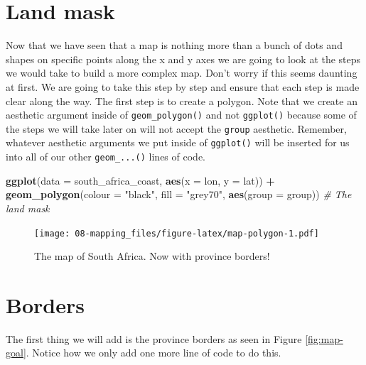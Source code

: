 \documentclass[
]{book}
\newenvironment{Shaded}{\begin{snugshade}}{\end{snugshade}}
\newcommand{\CommentTok}[1]{\textcolor[rgb]{0.56,0.35,0.01}{\textit{#1}}}
\newcommand{\DataTypeTok}[1]{\textcolor[rgb]{0.13,0.29,0.53}{#1}}
\newcommand{\KeywordTok}[1]{\textcolor[rgb]{0.13,0.29,0.53}{\textbf{#1}}}
\newcommand{\NormalTok}[1]{#1}
\newcommand{\OperatorTok}[1]{\textcolor[rgb]{0.81,0.36,0.00}{\textbf{#1}}}
\newcommand{\StringTok}[1]{\textcolor[rgb]{0.31,0.60,0.02}{#1}}
\begin{document}
\hypertarget{land-mask}{%
\section{Land mask}\label{land-mask}}

Now that we have seen that a map is nothing more than a bunch of dots and shapes on specific points along the x and y axes we are going to look at the steps we would take to build a more complex map. Don't worry if this seems daunting at first. We are going to take this step by step and ensure that each step is made clear along the way. The first step is to create a polygon. Note that we create an aesthetic argument inside of \texttt{geom\_polygon()} and not \texttt{ggplot()} because some of the steps we will take later on will not accept the \texttt{group} aesthetic. Remember, whatever aesthetic arguments we put inside of \texttt{ggplot()} will be inserted for us into all of our other \texttt{geom\_...()} lines of code.

\begin{Shaded}
\begin{Highlighting}[]
\KeywordTok{ggplot}\NormalTok{(}\DataTypeTok{data =}\NormalTok{ south\_africa\_coast, }\KeywordTok{aes}\NormalTok{(}\DataTypeTok{x =}\NormalTok{ lon, }\DataTypeTok{y =}\NormalTok{ lat)) }\OperatorTok{+}
\StringTok{  }\KeywordTok{geom\_polygon}\NormalTok{(}\DataTypeTok{colour =} \StringTok{"black"}\NormalTok{, }\DataTypeTok{fill =} \StringTok{"grey70"}\NormalTok{, }\KeywordTok{aes}\NormalTok{(}\DataTypeTok{group =}\NormalTok{ group)) }\CommentTok{\# The land mask}
\end{Highlighting}
\end{Shaded}

\begin{figure}
\centering
\texttt{[image: 08-mapping\_files/figure-latex/map-polygon-1.pdf]}
\caption{\label{fig:map-polygon}The map of South Africa. Now with province borders!}
\end{figure}

\hypertarget{borders}{%
\section{Borders}\label{borders}}

The first thing we will add is the province borders as seen in Figure \ref{fig:map-goal}. Notice how we only add one more line of code to do this.
\end{document}
